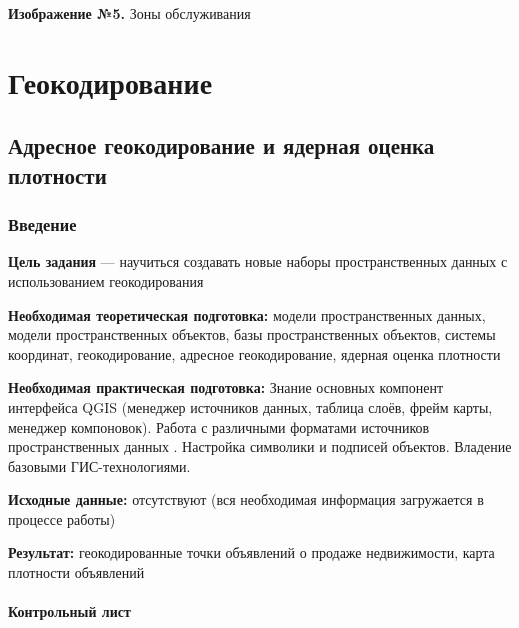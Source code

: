 \documentclass[
  12pt,
]{book}
\begin{document}
\textbf{Изображение №5.} Зоны обслуживания

\hypertarget{part-ux433ux435ux43eux43aux43eux434ux438ux440ux43eux432ux430ux43dux438ux435}{%
\part{Геокодирование}\label{part-ux433ux435ux43eux43aux43eux434ux438ux440ux43eux432ux430ux43dux438ux435}}

\hypertarget{geocoding}{%
\chapter{Адресное геокодирование и ядерная оценка плотности}\label{geocoding}}

\hypertarget{geoding-intro}{%
\section{Введение}\label{geoding-intro}}

\textbf{Цель задания} --- научиться создавать новые наборы пространственных данных с использованием геокодирования

\textbf{Необходимая теоретическая подготовка:} модели пространственных данных, модели пространственных объектов, базы пространственных объектов, системы координат, геокодирование, адресное геокодирование, ядерная оценка плотности

\textbf{Необходимая практическая подготовка:} Знание основных компонент интерфейса QGIS (менеджер источников данных, таблица слоёв, фрейм карты, менеджер компоновок). Работа с различными форматами источников пространственных данных . Настройка символики и подписей объектов. Владение базовыми ГИС-технологиями.

\textbf{Исходные данные:} отсутствуют (вся необходимая информация загружается в процессе работы)

\textbf{Результат:} геокодированные точки объявлений о продаже недвижимости, карта плотности объявлений

\hypertarget{geocoding-control}{%
\subsection{Контрольный лист}\label{geocoding-control}}
\end{document}
